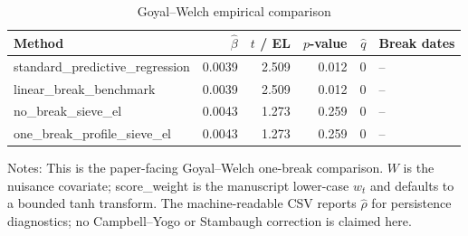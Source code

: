 \begin{table}[t]
\centering
\caption{Goyal--Welch empirical comparison}
\label{tab:goyal-welch-empirical-comparison}
\begin{tabular}{lrrrrl}
\hline
Method & $\widehat\beta$ & $t$ / EL & $p$-value & $\widehat q$ & Break dates \\
\hline
standard\_predictive\_regression & 0.0039 & 2.509 & 0.012 & 0 & -- \\
linear\_break\_benchmark & 0.0039 & 2.509 & 0.012 & 0 & -- \\
no\_break\_sieve\_el & 0.0043 & 1.273 & 0.259 & 0 & -- \\
one\_break\_profile\_sieve\_el & 0.0043 & 1.273 & 0.259 & 0 & -- \\
\hline
\end{tabular}
\begin{minipage}{0.94\linewidth}
\footnotesize Notes: This is the paper-facing Goyal--Welch one-break comparison. $W$ is the nuisance covariate; score\_weight is the manuscript lower-case $w_t$ and defaults to a bounded tanh transform. The machine-readable CSV reports $\widehat\rho$ for persistence diagnostics; no Campbell--Yogo or Stambaugh correction is claimed here.
\end{minipage}
\end{table}
